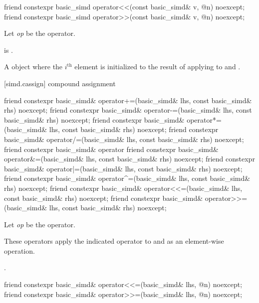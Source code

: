 \begin{itemdecl}
friend constexpr basic_simd operator<<(const basic_simd& v, @\simdsizetype@ n) noexcept;
friend constexpr basic_simd operator>>(const basic_simd& v, @\simdsizetype@ n) noexcept;
\end{itemdecl}

\begin{itemdescr}
  \pnum Let \textit{op} be the operator.

  \pnum\constraints
   is .

  \pnum\returns
  A  object where the $i^\text{th}$ element is initialized to the result of
  applying \op{} to  and  \foralli.
\end{itemdescr}

[simd.cassign]{ compound assignment}

\begin{itemdecl}
friend constexpr basic_simd& operator+=(basic_simd& lhs, const basic_simd& rhs) noexcept;
friend constexpr basic_simd& operator-=(basic_simd& lhs, const basic_simd& rhs) noexcept;
friend constexpr basic_simd& operator*=(basic_simd& lhs, const basic_simd& rhs) noexcept;
friend constexpr basic_simd& operator/=(basic_simd& lhs, const basic_simd& rhs) noexcept;
friend constexpr basic_simd& operator%
friend constexpr basic_simd& operator&=(basic_simd& lhs, const basic_simd& rhs) noexcept;
friend constexpr basic_simd& operator|=(basic_simd& lhs, const basic_simd& rhs) noexcept;
friend constexpr basic_simd& operator^=(basic_simd& lhs, const basic_simd& rhs) noexcept;
friend constexpr basic_simd& operator<<=(basic_simd& lhs, const basic_simd& rhs) noexcept;
friend constexpr basic_simd& operator>>=(basic_simd& lhs, const basic_simd& rhs) noexcept;
\end{itemdecl}

\begin{itemdescr}
  \pnum Let \textit{op} be the operator.

  \pnum\ConstraintOperatorTWellFormed

  \pnum\effects
  These operators apply the indicated operator to  and  as an element-wise
  operation.

  \pnum\returns
  .
\end{itemdescr}

\begin{itemdecl}
friend constexpr basic_simd& operator<<=(basic_simd& lhs, @\simdsizetype@ n) noexcept;
friend constexpr basic_simd& operator>>=(basic_simd& lhs, @\simdsizetype@ n) noexcept;
\end{itemdecl}

